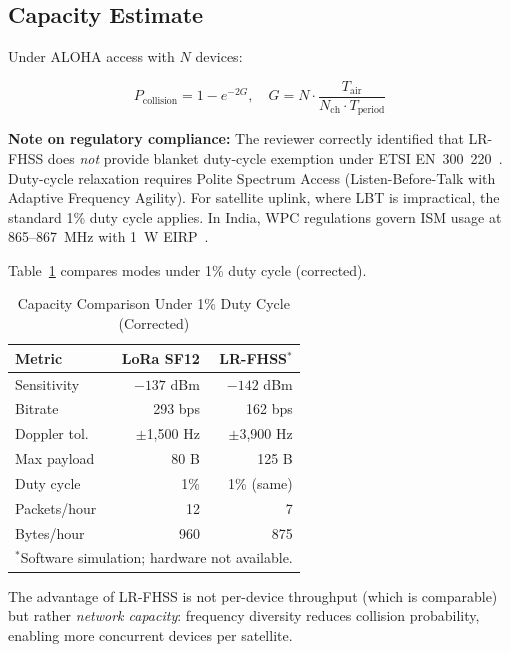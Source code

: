 \documentclass[11pt,a4paper]{article}
\begin{document}
\subsection{Capacity Estimate}

Under ALOHA access with $N$ devices:

\begin{equation}
P_{\text{collision}} = 1 - e^{-2G}, \quad G = N \cdot \frac{T_{\text{air}}}{N_{\text{ch}} \cdot T_{\text{period}}}
\end{equation}

\textbf{Note on regulatory compliance:} The reviewer correctly identified that LR-FHSS does \emph{not} provide blanket duty-cycle exemption under ETSI EN~300~220~\cite{etsi_en300220}. Duty-cycle relaxation requires Polite Spectrum Access (Listen-Before-Talk with Adaptive Frequency Agility). For satellite uplink, where LBT is impractical, the standard 1\% duty cycle applies. In India, WPC regulations govern ISM usage at 865--867~MHz with 1~W EIRP~\cite{wpc_india}.

Table~\ref{tab:lrfhss} compares modes under 1\% duty cycle (corrected).

\begin{table}[H]
\centering
\caption{Capacity Comparison Under 1\% Duty Cycle (Corrected)}
\begin{tabular}{lrr}
\toprule
\textbf{Metric} & \textbf{LoRa SF12} & \textbf{LR-FHSS$^*$} \\
\midrule
Sensitivity & $-137$ dBm & $-142$ dBm \\
Bitrate & 293 bps & 162 bps \\
Doppler tol. & $\pm$1,500 Hz & $\pm$3,900 Hz \\
Max payload & 80 B & 125 B \\
Duty cycle & 1\% & 1\% (same) \\
Packets/hour & 12 & 7 \\
Bytes/hour & 960 & 875 \\
\bottomrule
\multicolumn{3}{l}{\footnotesize $^*$Software simulation; hardware not available.}
\end{tabular}
\label{tab:lrfhss}
\end{table}

The advantage of LR-FHSS is not per-device throughput (which is comparable) but rather \emph{network capacity}: frequency diversity reduces collision probability, enabling more concurrent devices per satellite.

\end{document}
